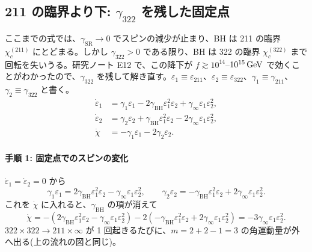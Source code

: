 \subsection{211 の臨界より下: $\gamma_{322}$ を残した固定点}\label{sec:below211}

ここまでの式では、$\gamma_\mathrm{SR}\to0$ でスピンの減少が止まり、BH は 211 の臨界 $\chi_c^{(211)}$ にとどまる。しかし $\gamma_{322}>0$ である限り、BH は 322 の臨界 $\chi_c^{(322)}$ まで回転を失いうる。研究ノート E12 で、この降下が $f\gtrsim10^{14}$--$10^{15}\,\mathrm{GeV}$ で効くことがわかったので、$\gamma_{322}$ を残して解き直す。$\varepsilon_1\equiv\varepsilon_{211}$、$\varepsilon_2\equiv\varepsilon_{322}$、$\gamma_1\equiv\gamma_{211}$、$\gamma_2\equiv\gamma_{322}$ と書く。
\begin{align}
\dot\varepsilon_1&=\gamma_1\varepsilon_1-2\gamma_\mathrm{BH}\varepsilon_1^2\varepsilon_2+\gamma_\infty\varepsilon_1\varepsilon_2^2,\\
\dot\varepsilon_2&=\gamma_2\varepsilon_2+\gamma_\mathrm{BH}\varepsilon_1^2\varepsilon_2-2\gamma_\infty\varepsilon_1\varepsilon_2^2,\\
\dot\chi&=-\gamma_1\varepsilon_1-2\gamma_2\varepsilon_2.
\end{align}

\paragraph{手順 1: 固定点でのスピンの変化}
$\dot\varepsilon_1=\dot\varepsilon_2=0$ から
\begin{equation}
\gamma_1\varepsilon_1=2\gamma_\mathrm{BH}\varepsilon_1^2\varepsilon_2-\gamma_\infty\varepsilon_1\varepsilon_2^2,\qquad
\gamma_2\varepsilon_2=-\gamma_\mathrm{BH}\varepsilon_1^2\varepsilon_2+2\gamma_\infty\varepsilon_1\varepsilon_2^2 .
\end{equation}
これを $\dot\chi$ に入れると、$\gamma_\mathrm{BH}$ の項が消えて
\begin{equation}
\dot\chi=-(2\gamma_\mathrm{BH}\varepsilon_1^2\varepsilon_2-\gamma_\infty\varepsilon_1\varepsilon_2^2)-2(-\gamma_\mathrm{BH}\varepsilon_1^2\varepsilon_2+2\gamma_\infty\varepsilon_1\varepsilon_2^2)
=-3\gamma_\infty\varepsilon_1\varepsilon_2^2 .
\label{eq:chidot_fp}
\end{equation}
$322\times322\to211\times\infty$ が 1 回起きるたびに、$m=2+2-1=3$ の角運動量が外へ出る(上の流れの図と同じ)。

